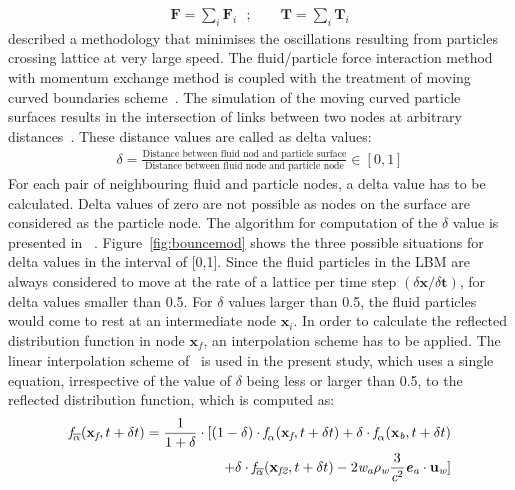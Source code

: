 \begin{align}
\textbf{F} = \sum\limits_{\textit{i}}{\textbf{F}_{\textit{i}}} \mbox{ }; \qquad \textbf{T} = \sum\limits_{\textit{i}}{\textbf{T}_{\textit{i}}}
\end{align}
\citet{Ladd2001} described a methodology that minimises the oscillations resulting from particles crossing lattice at very large speed. The fluid/particle force interaction method with momentum exchange method is coupled with the treatment of moving curved boundaries scheme~\citep{yu2002unified,yu2003viscous}. The simulation of the moving curved particle surfaces results in the intersection of links between two nodes at arbitrary distances~\citep{iglberger2008}. These distance values are called as delta values:
\begin{align}
\delta = \frac{\mbox{Distance between fluid nod and particle surface}}{\mbox{Distance between fluid node and particle node}} \in [0,1]
\end{align} 
For each pair of neighbouring fluid and particle nodes, a delta value has to be calculated. Delta values of zero are not possible as nodes on the surface are considered as the particle node. The algorithm for computation of the $\delta$ value is presented in ~\citet{iglberger2008}. Figure~\ref{fig:bouncemod} shows the three possible situations for delta values in the interval of [0,1]. Since the fluid particles in the LBM are always considered to move at the rate of a lattice per time step $(\delta \textbf{x}/ \delta \textbf{t})$, for delta values smaller than 0.5. For $\delta$ values larger than 0.5, the fluid particles would come to rest at an intermediate node $\textbf{x}_{\textit{i}}$. In order to calculate the reflected distribution function in node $\textbf{x}_{\textit{f}}$, an interpolation scheme has to be applied. The linear interpolation scheme of~\citet{yu2002unified, yu2003viscous} is used in the present study, which uses a single equation, irrespective of the value of $\delta$ being less or larger than 0.5, to the reflected distribution function, which is computed as:
\begin{align}
 \nonumber
\textit{\textit{f}}_{\overline{\alpha}}(\textbf{x}_{\textit{f}},t + \delta t) = \frac{1}{1 + \delta} \cdot [(1-\delta)\cdot \textit{\textit{f}}_{\alpha}(\textbf{x}_{\textit{f}},t + \delta t) + \delta \cdot \textit{\textit{f}}_{\alpha}(\textbf{x}_{\textit{b}},t + \delta t)  \\
+ \delta \cdot \textit{\textit{f}}_{\overline{\alpha}}(\textbf{x}_{\textit{f2}},t + \delta t) -2\textit{w}_{\textit{a}}\rho_{\textit{w}}\frac{3}{\textit{c}^{2}}\textbf{\textit{e}}_{\textit{a}}\cdot \textbf{u}_{\textit{w}}]
\end{align}
